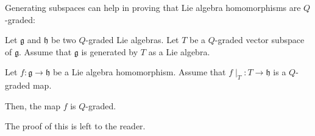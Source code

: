 \documentclass[etingof-lie.tex]{subfiles}
\begin{document}
Generating subspaces can help in proving that Lie algebra homomorphisms are
$Q$-graded:

\begin{proposition}
\label{prop.generation.Q-gr}Let $\mathfrak{g}$ and $\mathfrak{h}$ be two
$Q$-graded Lie algebras. Let $T$ be a $Q$-graded vector subspace of
$\mathfrak{g}$. Assume that $\mathfrak{g}$ is generated by $T$ as a Lie algebra.

Let $f:\mathfrak{g}\rightarrow\mathfrak{h}$ be a Lie algebra homomorphism.
Assume that $f\mid_{T}:T\rightarrow\mathfrak{h}$ is a $Q$-graded map.

Then, the map $f$ is $Q$-graded.
\end{proposition}

\begin{vershort}
The proof of this is left to the reader.
\end{vershort}
\end{document}

